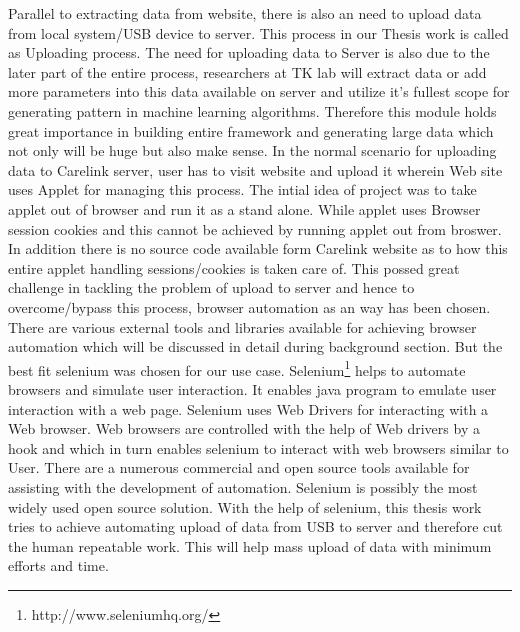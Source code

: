 \documentclass[article,type=msc,colorback,accentcolor=tud9c,twoside,11pt]{tudthesis}
\begin{document}
	Parallel to extracting data from website, there is also an need to upload data from local system/USB device to server. This process in our Thesis work is called as Uploading process. The need for uploading data to Server is also due to the later part of the entire process, researchers at TK lab will extract data or add more parameters into this data available on server and utilize it's fullest scope for generating pattern in machine learning algorithms. Therefore this module holds great importance in building entire framework and generating large data which not only will be huge but also make sense. In the normal scenario for uploading data to Carelink server, user has to visit website and upload it wherein Web site uses Applet for managing this process. The intial idea of project was to take applet out of browser and run it as a stand alone. While applet uses Browser session cookies and this cannot be achieved by running applet out from broswer. In addition there is no source code available form Carelink website as to how this entire applet handling sessions/cookies is taken care of. This possed great challenge in tackling the problem of upload to server and hence to overcome/bypass this process, browser automation as an way has been chosen. There are various external tools and libraries available for achieving browser automation which will be discussed in detail during background section. But the best fit selenium  was chosen for our use case. Selenium\footnote{http://www.seleniumhq.org/} helps to automate browsers and simulate user interaction. It enables java program to emulate user interaction with a web page. Selenium\cite{Webdriver} uses Web Drivers for interacting with a Web browser. Web browsers are controlled with the help of Web drivers by a hook and which in turn enables selenium to interact with web browsers similar to User. There are a numerous commercial and open source tools available for assisting with the development of automation. Selenium is possibly the most widely used open source solution. With the help of selenium, this thesis work tries to achieve automating upload of data from USB to server and therefore cut the human repeatable work. This will help mass upload of data with minimum efforts and time.
	
\end{document}
